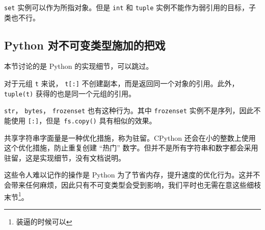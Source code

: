 \texttt{set} 实例可以作为所指对象。但是 \texttt{int} 和 \texttt{tuple} 实例不能作为弱引用的目标，子类也不行。

\subsection{Python 对不可变类型施加的把戏}

本节讨论的是 Python 的实现细节，可以跳过。

对于元组 \texttt{t} 来说， \texttt{t[:]} 不创建副本，而是返回同一个对象的引用。此外，\texttt{tuple(t)} 获得的也是同一个元组的引用。

\texttt{str}， \texttt{bytes}， \texttt{frozenset} 也有这种行为。其中 \texttt{frozenset} 实例不是序列，因此不能使用 \texttt{[:]}，但是\texttt{ fs.copy()} 具有相似的效果。

共享字符串字面量是一种优化措施，称为驻留。CPython 还会在小的整数上使用这个优化措施，防止重复创建 ``热门'' 数字。但并不是所有字符串和数字都会采用驻留，这是实现细节，没有文档说明。

这些令人难以记作的操作是 Python 为了节省内存，提升速度的优化行为。这并不会带来任何麻烦，因此只有不可变类型会受到影响，我们平时也无需在意这些细枝末节\footnote{装逼的时候可以}。

\newpage